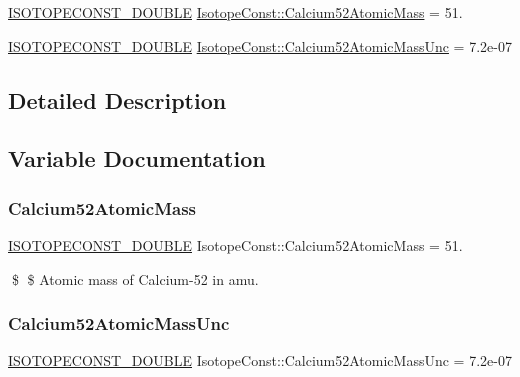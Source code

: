 \begin{DoxyCompactItemize}
\item 
\mbox{\hyperlink{group___isotope_const-_macros_ga8f45a7272ce02c0b4c65c44636ed719a}{I\+S\+O\+T\+O\+P\+E\+C\+O\+N\+S\+T\+\_\+\+D\+O\+U\+B\+LE}} \mbox{\hyperlink{group___isotope_const-_calcium-_ca52_ga65c472aa68a0545b83e1423685b54865}{Isotope\+Const\+::\+Calcium52\+Atomic\+Mass}} = 51.
\item 
\mbox{\hyperlink{group___isotope_const-_macros_ga8f45a7272ce02c0b4c65c44636ed719a}{I\+S\+O\+T\+O\+P\+E\+C\+O\+N\+S\+T\+\_\+\+D\+O\+U\+B\+LE}} \mbox{\hyperlink{group___isotope_const-_calcium-_ca52_ga62e1d4d673b3d903f4a9c4a25cc88af8}{Isotope\+Const\+::\+Calcium52\+Atomic\+Mass\+Unc}} = 7.\+2e-\/07
\end{DoxyCompactItemize}


\subsection{Detailed Description}


\subsection{Variable Documentation}
\mbox{\label{group___isotope_const-_calcium-_ca52_ga65c472aa68a0545b83e1423685b54865}} 
\subsubsection{\texorpdfstring{Calcium52\+Atomic\+Mass}{Calcium52AtomicMass}}
{\footnotesize\ttfamily \mbox{\hyperlink{group___isotope_const-_macros_ga8f45a7272ce02c0b4c65c44636ed719a}{I\+S\+O\+T\+O\+P\+E\+C\+O\+N\+S\+T\+\_\+\+D\+O\+U\+B\+LE}} Isotope\+Const\+::\+Calcium52\+Atomic\+Mass = 51.}

\$ \$ Atomic mass of Calcium-\/52 in amu. \mbox{\label{group___isotope_const-_calcium-_ca52_ga62e1d4d673b3d903f4a9c4a25cc88af8}} 
\subsubsection{\texorpdfstring{Calcium52\+Atomic\+Mass\+Unc}{Calcium52AtomicMassUnc}}
{\footnotesize\ttfamily \mbox{\hyperlink{group___isotope_const-_macros_ga8f45a7272ce02c0b4c65c44636ed719a}{I\+S\+O\+T\+O\+P\+E\+C\+O\+N\+S\+T\+\_\+\+D\+O\+U\+B\+LE}} Isotope\+Const\+::\+Calcium52\+Atomic\+Mass\+Unc = 7.\+2e-\/07}

